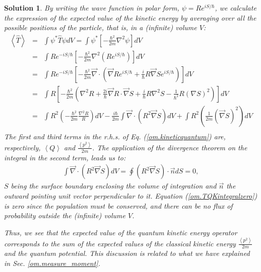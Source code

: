 \documentclass[nofootinbib, secnumarabic, amsmath, nobibnotes,11pt,aps,pra, floatfix]{revtex4-1}
\newtheorem{solution}{Solution}
\newcommand{\sref}[1]{Sec. \ref{#1}}
\newcommand{\eref}[1]{Eq. (\ref{#1})}
\newcommand{\Eref}[1]{Equation (\ref{#1})}
\begin{document}
\begin{solution}

By writing the wave function in polar form, $\psi = R e^{iS/\hbar}$, we calculate the expression of the expected value of the kinetic energy by averaging over all the possible positions of the particle, that is, in a (infinite) volume $V$:
\begin{eqnarray}
\left\langle \hat{T} \right\rangle &=& \int \psi^* \hat{T} \psi dV = \int \psi^* \left[-\frac{\hbar^2}{2m} \nabla^2 \psi \right] dV \nonumber\\
&=& \int R e^{-iS/\hbar} \left[-\frac{\hbar^2}{2m} \nabla^2 (R e^{iS/\hbar}) \right] dV \nonumber\\
&=& \int R e^{-iS/\hbar} \left[-\frac{\hbar^2}{2m} \vec{\nabla} \cdot \left( \vec{\nabla} R e^{iS/\hbar} + \frac{i}{\hbar} R \vec{\nabla} S e^{iS/\hbar} \right) \right] dV \nonumber\\
&=& \int R \!\left[-\frac{\hbar^2}{2m}\! \left(\! \nabla^2 R +
\frac{2i}{\hbar} \vec{\nabla} R \cdot \vec{\nabla} S + \frac{i}{\hbar} R \nabla^2 S - \frac{1}{\hbar^2} R (\nabla S)^2 \!\right)\! \right] dV \nonumber\\
&=& \int R^2 \left(-\frac{\hbar^2}{2m} \frac{\nabla^2 R}{R} \right)
dV - \frac{i \hbar}{2m} \int \vec{\nabla} \cdot \left( R^2
\vec{\nabla} S\right) dV + \int R^2 \left( \frac{1}{2m} (\vec{\nabla} S)^2 \right) dV\nonumber\\
\label{om.kineticquantum}
\end{eqnarray}
The first and third terms in the r.h.s. of \eref{om.kineticquantum} are, respectively, $\left\langle Q \right\rangle$ and $\frac{\left\langle p^2 \right\rangle}{2m}$. The application of the divergence theorem on the integral in the second term, leads us to:
\begin{eqnarray}
\int \vec{\nabla} \cdot \left( R^2 \vec{\nabla} S\right) dV = \oint \left( R^2 \vec{\nabla} S \right) \cdot \vec{n} dS = 0, 
\label{om.TQKintegralzero}
\end{eqnarray}
$S$ being the surface boundary enclosing the volume of integration
and $\vec{n}$ the outward pointing unit vector perpendicular to it.
\Eref{om.TQKintegralzero} is zero since the population must be
conserved, and there can be no flux of probability outside the
(infinite) volume $V$.

Thus, we see that the expected value of the quantum kinetic energy operator corresponds to the sum of the expected values of the classical kinetic energy $\frac{\left\langle p^2 \right\rangle}{2m}$ and the quantum potential. This discussion is related to what we have explained in \sref{om.measure_moment}.

\end{solution}
\end{document}

